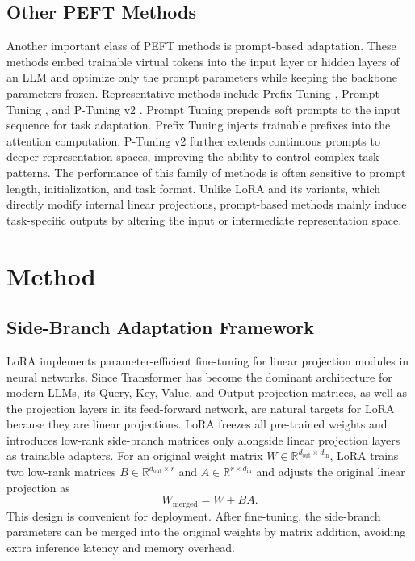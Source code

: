 \documentclass[a4paper,11pt]{article}
\newcommand{\R}{\mathbb{R}}
\begin{document}
\subsection{Other PEFT Methods}

Another important class of PEFT methods is prompt-based adaptation. These methods embed trainable virtual tokens into the input layer or hidden layers of an LLM and optimize only the prompt parameters while keeping the backbone parameters frozen. Representative methods include Prefix Tuning \cite{li2021prefix}, Prompt Tuning \cite{lester2021power}, and P-Tuning v2 \cite{xiao2022ptuning}. Prompt Tuning prepends soft prompts to the input sequence for task adaptation. Prefix Tuning injects trainable prefixes into the attention computation. P-Tuning v2 further extends continuous prompts to deeper representation spaces, improving the ability to control complex task patterns. The performance of this family of methods is often sensitive to prompt length, initialization, and task format. Unlike LoRA and its variants, which directly modify internal linear projections, prompt-based methods mainly induce task-specific outputs by altering the input or intermediate representation space.

\section{Method}

\subsection{Side-Branch Adaptation Framework}

LoRA implements parameter-efficient fine-tuning for linear projection modules in neural networks. Since Transformer \cite{vaswani2017attention} has become the dominant architecture for modern LLMs, its Query, Key, Value, and Output projection matrices, as well as the projection layers in its feed-forward network, are natural targets for LoRA because they are linear projections. LoRA freezes all pre-trained weights and introduces low-rank side-branch matrices only alongside linear projection layers as trainable adapters. For an original weight matrix $W\in\R^{d_{\mathrm{out}}\times d_{\mathrm{in}}}$, LoRA trains two low-rank matrices $B\in\R^{d_{\mathrm{out}}\times r}$ and $A\in\R^{r\times d_{\mathrm{in}}}$ and adjusts the original linear projection as
\begin{equation}
    W_{\mathrm{merged}} = W + BA .
\end{equation}
This design is convenient for deployment. After fine-tuning, the side-branch parameters can be merged into the original weights by matrix addition, avoiding extra inference latency and memory overhead.
\end{document}

